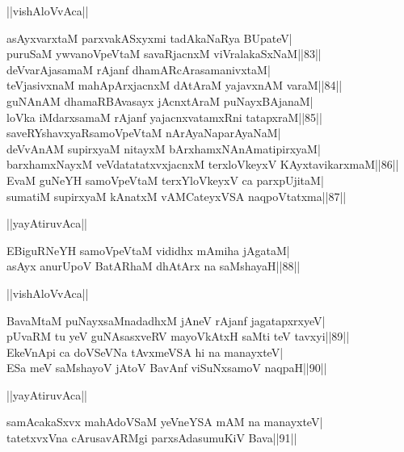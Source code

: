 \documentclass{article}
\begin{document}
\begin{center}
||vishAloVvAca||
\end{center}

asAyxvarxtaM parxvakASxyxmi tadAkaNaRya BUpateV|\\
puruSaM ywvanoVpeVtaM savaRjacnxM viVralakaSxNaM||83||\\
deVvarAjasamaM rAjanf dhamARcArasamanivxtaM|\\
teVjasivxnaM mahApArxjacnxM dAtAraM yajavxnAM varaM||84||\\
guNAnAM dhamaRBAvasayx jAcnxtAraM puNayxBAjanaM|\\
loVka iMdarxsamaM rAjanf yajacnxvatamxRni tatapxraM||85||\\
saveRYshavxyaRsamoVpeVtaM nArAyaNaparAyaNaM|\\
deVvAnAM supirxyaM nitayxM bArxhamxNAnAmatipirxyaM|\\
barxhamxNayxM veVdatatatxvxjacnxM terxloVkeyxV KAyxtavikarxmaM||86||\\
EvaM guNeYH samoVpeVtaM terxYloVkeyxV ca parxpUjitaM|\\
sumatiM supirxyaM kAnatxM vAMCateyxVSA naqpoVtatxma||87||\\

\begin{center}
||yayAtiruvAca||
\end{center}

EBiguRNeYH samoVpeVtaM vididhx mAmiha jAgataM|\\
asAyx anurUpoV BatARhaM dhAtArx na saMshayaH||88||\\

\begin{center}
||vishAloVvAca||
\end{center}

BavaMtaM puNayxsaMnadadhxM jAneV rAjanf jagatapxrxyeV|\\
pUvaRM tu yeV guNAsasxveRV mayoVkAtxH saMti teV tavxyi||89||\\
EkeVnApi ca doVSeVNa tAvxmeVSA hi na manayxteV|\\
ESa meV saMshayoV jAtoV BavAnf viSuNxsamoV naqpaH||90||\\

\begin{center}
||yayAtiruvAca||
\end{center}

samAcakaSxvx mahAdoVSaM yeVneYSA mAM na manayxteV|\\
tatetxvxVna cArusavARMgi parxsAdasumuKiV Bava||91||\\
\end{document}
